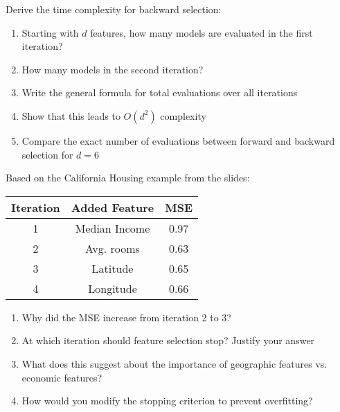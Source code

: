 \documentclass{article}
\newcounter{exercise}
\begin{document}
\begin{tcolorbox}[colback=blue!5!white,colframe=blue!75!black,title=\textbf{Exercise \theexercise: Time Complexity Derivation}]
Derive the time complexity for backward selection:

\begin{enumerate}[label=(\alph*)]
    \item Starting with $d$ features, how many models are evaluated in the first iteration?
    \item How many models in the second iteration?
    \item Write the general formula for total evaluations over all iterations
    \item Show that this leads to $O(d^2)$ complexity
    \item Compare the exact number of evaluations between forward and backward selection for $d=6$
\end{enumerate}
\end{tcolorbox}

\begin{tcolorbox}[colback=blue!5!white,colframe=blue!75!black,title=\textbf{Exercise \theexercise: California Housing Analysis}]
Based on the California Housing example from the slides:

\begin{center}
\begin{tabular}{|c|c|c|}
\hline
\textbf{Iteration} & \textbf{Added Feature} & \textbf{MSE} \\
\hline
1 & Median Income & 0.97 \\
2 & Avg. rooms & 0.63 \\
3 & Latitude & 0.65 \\
4 & Longitude & 0.66 \\
\hline
\end{tabular}
\end{center}

\begin{enumerate}[label=(\alph*)]
    \item Why did the MSE increase from iteration 2 to 3?
    \item At which iteration should feature selection stop? Justify your answer
    \item What does this suggest about the importance of geographic features vs. economic features?
    \item How would you modify the stopping criterion to prevent overfitting?
\end{enumerate}
\end{tcolorbox}
\end{document}
